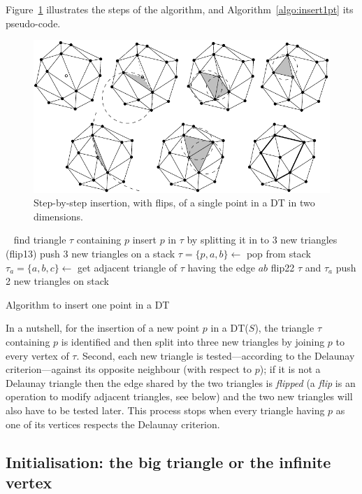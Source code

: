 Figure~\ref{fig:insertion_steps} illustrates the steps of the algorithm, and Algorithm~\ref{algo:insert1pt} its pseudo-code. 
\begin{figure}
  \centering
  \includegraphics[width=0.9\linewidth]{insertion_steps}
  \caption{Step-by-step insertion, with flips, of a single point in a DT in two dimensions.}%
\label{fig:insertion_steps}
\end{figure}
\begin{algorithm}[tb] 
  \DontPrintSemicolon\
  find triangle $\tau$ containing $p$\;
  insert $p$ in $\tau$ by splitting it in to 3 new triangles (flip13)\;
  push 3 new triangles on a stack\;
  {
    $\tau = \{p,a,b\} \leftarrow$ pop from stack\;
    $\tau_{a} = \{a,b,c\} \leftarrow$ get adjacent triangle of $\tau$ having the edge $ab$\;
    \If{$c$ is inside circumcircle of $\tau$}
    {
      flip22 $\tau$ and $\tau_{a}$\;
      push 2 new triangles on stack\;
    }
  }
  \caption{Algorithm to insert one point in a DT}%
\label{algo:insert1pt}
\end{algorithm} 
In a nutshell, for the insertion of a new point $p$ in a DT($S$), the triangle $\tau$ containing $p$ is identified and then split into three new triangles by joining $p$ to every vertex of $\tau$. 
Second, each new triangle is tested---according to the Delaunay criterion---against its opposite neighbour (with respect to $p$); if it is not a Delaunay triangle then the edge shared by the two triangles is \emph{flipped} (a \emph{flip} is an operation to modify adjacent triangles, see below) and the two new triangles will also have to be tested later. 
This process stops when every triangle having $p$ as one of its vertices respects the Delaunay criterion.


\subsection{Initialisation: the big triangle or the infinite vertex}%
\label{sec:big_tr}

